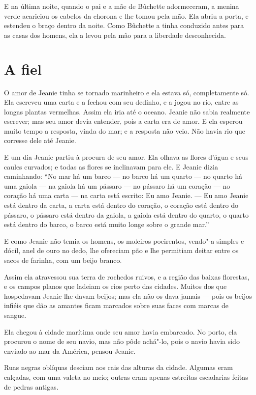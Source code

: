 E na última noite, quando o pai e a mãe de Bûchette adormeceram, a
menina verde acariciou os cabelos da chorona e lhe tomou pela mão. Ela
abriu a porta, e estendeu o braço dentro da noite. Como Bûchette a tinha
conduzido antes para as casas dos homens, ela a levou pela mão para a
liberdade desconhecida.

\section*{A fiel}

O amor de Jeanie tinha se tornado marinheiro e ela estava só,
completamente só. Ela escreveu uma carta e a fechou com seu dedinho, e a
jogou no rio, entre as longas plantas vermelhas. Assim ela iria até o
oceano. Jeanie não sabia realmente escrever; mas seu amor devia entender,
pois a carta era de amor. E ela esperou muito tempo a resposta, vinda do
mar; e a resposta não veio. Não havia rio que corresse dele até Jeanie.

E um dia Jeanie partiu à procura de seu amor. Ela olhava as flores
d’água e seus caules curvados; e todas as flores se inclinavam para ele. E
Jeanie dizia caminhando: “No mar há um barco --- no barco há um quarto --- no
quarto há uma gaiola --- na gaiola há um pássaro --- no pássaro há um coração
--- no coração há uma carta --- na carta está escrito: Eu amo Jeanie. --- Eu amo
Jeanie está dentro da carta, a carta está dentro do coração, o coração
está dentro do pássaro, o pássaro está dentro da gaiola, a gaiola está
dentro do quarto, o quarto está dentro do barco, o barco está muito longe
sobre o grande mar.”

E como Jeanie não temia os homens, os moleiros poeirentos, vendo"-a
simples e dócil, anel de ouro no dedo, lhe ofereciam pão e lhe permitiam
deitar entre os sacos de farinha, com um beijo branco.

Assim ela atravessou sua terra de rochedos ruivos, e a região das
baixas florestas, e os campos planos que ladeiam os rios perto das
cidades. Muitos dos que hospedavam Jeanie lhe davam beijos; mas ela não os
dava jamais --- pois os beijos infiéis que dão as amantes ficam marcados
sobre suas faces com marcas de sangue.

Ela chegou à cidade marítima onde seu amor havia embarcado. No porto,
ela procurou o nome de seu navio, mas não pôde achá"-lo, pois o navio havia
sido enviado ao mar da América, pensou Jeanie.

Ruas negras oblíquas desciam aos cais das alturas da cidade. Algumas
eram calçadas, com uma valeta no meio; outras eram apenas estreitas
escadarias feitas de pedras antigas.

